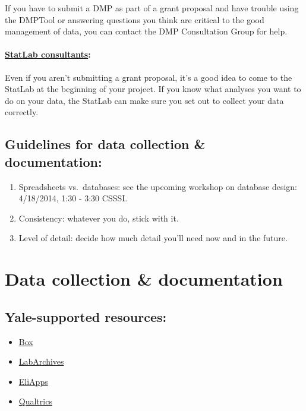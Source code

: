 \documentclass{tufte-handout}
\begin{document}
If you have to submit a DMP as part of a grant proposal and have trouble
using the DMPTool or answering questions you think are critical to the
good management of data, you can contact the DMP Consultation Group for
help.

\paragraph{\href{http://csssi.yale.edu/csssi-statistical-consultants-schedule}{StatLab
consultants}:}\label{statlab-consultants}

Even if you aren't submitting a grant proposal, it's a good idea to come
to the StatLab at the beginning of your project. If you know what
analyses you want to do on your data, the StatLab can make sure you set
out to collect your data correctly.

\marginnote
{\subsection{Guidelines for data collection \& documentation:}\label{guidelines-doc}
\begin{enumerate}
\def\labelenumi{\arabic{enumi}.}
\itemsep1pt\parskip0pt
\item
  Spreadsheets vs.~databases: see the upcoming workshop on database
  design: 4/18/2014, 1:30 - 3:30 CSSSI.
\item
  Consistency: whatever you do, stick with it.
\item
  Level of detail: decide how much detail you'll need now and in the
  future.
\end{enumerate}}

\section{Data collection \& documentation}\label{data-collection-documentation}

\subsection{Yale-supported resources:}\label{yale-supported}

\begin{itemize}
\item
  \href{http://its.yale.edu/services/collaboration-and-file-sharing/box-yale}{Box}
\item
  \href{http://its.yale.edu/services/research-technologies/elab-notebook/labarchives-faqs}{LabArchives}
\item
  \href{http://its.yale.edu/services/email-and-calendars/eliapps-google-apps-education}{EliApps}
\item
  \href{http://its.yale.edu/services/web-and-application-services/qualtrics-survey-tool}{Qualtrics}
\end{itemize}
\end{document}

